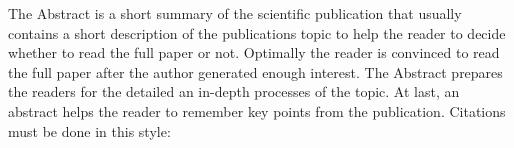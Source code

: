 The Abstract is a short summary of the scientific publication that usually
contains a short description of the publications topic to help the reader to
decide whether to read the full paper or not. Optimally the reader is convinced
to read the full paper after the author generated enough interest. The Abstract
prepares the readers for the detailed an in-depth processes of the topic. At
last, an abstract helps the reader to remember key points from the publication.
Citations must be done in this style:
